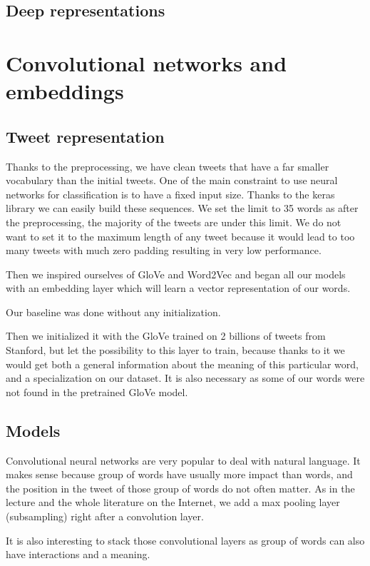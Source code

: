 \documentclass[10pt,conference,compsocconf,retainorgcmds]{IEEEtran}
\begin{document}
\subsection{Deep representations}
\section{Convolutional networks and embeddings}

\subsection{Tweet representation}

Thanks to the preprocessing, we have clean tweets that have a far smaller vocabulary than the initial tweets. One of the main constraint to use neural networks for classification is to have a fixed input size. Thanks to the keras library we can easily build these sequences. We set the limit to 35 words as after the preprocessing, the majority of the tweets are under this limit. We do not want to set it to the maximum length of any tweet because it would lead to too many tweets with much zero padding resulting in very low performance.

Then we inspired ourselves of GloVe and Word2Vec and began all our models with an embedding layer which will learn a vector representation of our words.

Our baseline was done without any initialization.

Then we initialized it with the GloVe trained on 2 billions of tweets from Stanford, but let the possibility to this layer to train, because thanks to it we would get both a general information about the meaning of this particular word, and a specialization on our dataset. It is also necessary as some of our words were not found in the pretrained GloVe model.

\subsection{Models}

Convolutional neural networks are very popular to deal with natural language. It makes sense because group of words have usually more impact than words, and the position in the tweet of those group of words do not often matter.
As in the lecture and the whole literature on the Internet, we add a max pooling layer (subsampling) right after a convolution layer.

It is also interesting to stack those convolutional layers as group of words can also have interactions and a meaning.
\end{document}
